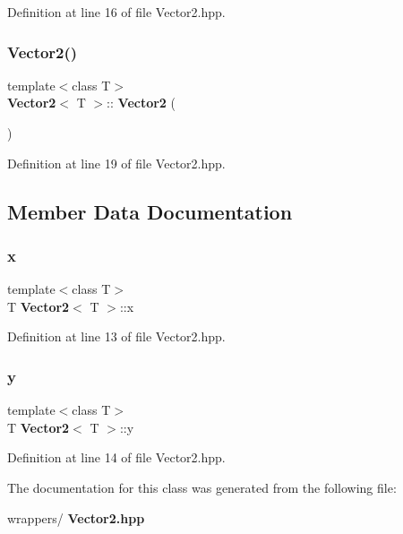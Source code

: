 Definition at line 16 of file Vector2.\+hpp.

\mbox{\label{class_vector2_ae2f1223cb0d664aa73afb789086a4174}} 
\subsubsection{Vector2()\hspace{0.1cm}{\footnotesize\ttfamily [2/2]}}
{\footnotesize\ttfamily template$<$class T$>$ \\
\textbf{ Vector2}$<$ T $>$\+::\textbf{ Vector2} (\begin{DoxyParamCaption}{ }\end{DoxyParamCaption})\hspace{0.3cm}{\ttfamily [inline]}}



Definition at line 19 of file Vector2.\+hpp.



\subsection{Member Data Documentation}
\mbox{\label{class_vector2_a78fa1f2ed5e261c7fbeb8f3536a1ee34}} 
\subsubsection{x}
{\footnotesize\ttfamily template$<$class T$>$ \\
T \textbf{ Vector2}$<$ T $>$\+::x}



Definition at line 13 of file Vector2.\+hpp.

\mbox{\label{class_vector2_a6cfed8355591aa269f4dba43bd806ef9}} 
\subsubsection{y}
{\footnotesize\ttfamily template$<$class T$>$ \\
T \textbf{ Vector2}$<$ T $>$\+::y}



Definition at line 14 of file Vector2.\+hpp.



The documentation for this class was generated from the following file\+:\begin{DoxyCompactItemize}
\item 
wrappers/\textbf{ Vector2.\+hpp}\end{DoxyCompactItemize}
